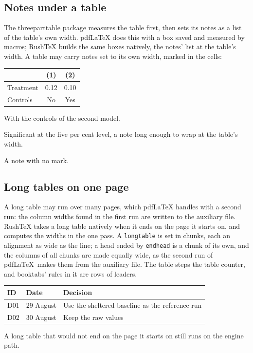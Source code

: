 \documentclass{article}
\numberwithin{equation}{section}
\theoremstyle{definition}
\theoremstyle{remark}
\begin{document}
\subsection{Notes under a table}\label{sec:tablenotes}
The threeparttable package measures the table first, then sets its notes as a list of the
table's own width. pdfLaTeX does this with a box saved and measured by macros; RushTeX
builds the same boxes natively, the notes' list at the table's width.
A table may carry notes set to its own width, marked in the cells:
\begin{center}
\begin{threeparttable}
  \begin{tabular}{lcc}
    \toprule
    & (1) & (2)\tnote{a} \\
    \midrule
    Treatment & 0.12\tnote{b} & 0.10 \\
    Controls & No & Yes \\
    \bottomrule
  \end{tabular}
  \begin{tablenotes}
    \small
    \item[a] With the controls of the second model.
    \item[b] Significant at the five per cent level, a note long enough to wrap at the table's width.
    \item A note with no mark.
  \end{tablenotes}
\end{threeparttable}
\end{center}

\clearpage

\subsection{Long tables on one page}
A long table may run over many pages, which pdfLaTeX handles with a second run: the column
widths found in the first run are written to the auxiliary file. RushTeX takes a long table
natively when it ends on the page it starts on, and computes the widths in the one pass.
A \texttt{longtable} is set in chunks, each an alignment as wide as the line; a head
ended by \texttt{endhead} is a chunk of its own, and the columns of all chunks are made
equally wide, as the second run of pdf\LaTeX\ makes them from the auxiliary file. The table
steps the table counter, and booktabs' rules in it are rows of leaders.
\begin{longtable}{@{}p{12mm}p{30mm}l@{}}
\toprule
ID & Date & Decision\\
\midrule
\endhead
D01 & 29 August & Use the sheltered baseline as the reference run\\
D02 & 30 August & Keep the raw values\\
\bottomrule
\end{longtable}
A long table that would not end on the page it starts on still runs on the engine path.
\end{document}
